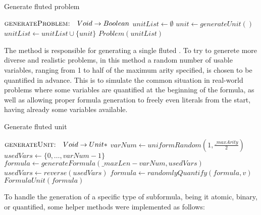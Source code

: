 \begin{algorithm}[H]
  \caption{Generate fluted problem}\label{alg:generate-fluted-problem}
  \begin{algorithmic}[1]
      \Statex{}  \(\textsc{generateProblem:} \quad Void \to Boolean\)
        \State{} \(unitList \gets \emptyset\)
          \State{} \(unit \gets generateUnit()\)
          \State{} \(unitList \gets unitList \cup \{unit\}\)
        \EndFor{}
        \State{} \Return{} \(Problem(unitList)\)
      \EndFunction{}
  \end{algorithmic}
\end{algorithm}



The  method is responsible for generating a single fluted .
To try to generete more diverse and realistic problems, in this method a random number of usable variables, ranging from 1 to half of the maximum arity specified, is chosen to be quantified in advance.
This is to simulate the common situation in real-world problems where some variables are quantified at the beginning of the formula, as well as allowing proper formula generation to freely even literals from the start, having already some variables available.

\begin{algorithm}[H]
  \caption{Generate fluted unit}\label{alg:generate-fluted-unit}
  \begin{algorithmic}[1]
      \Statex{}  \(\textsc{generateUnit:} \quad Void \to Unit*\)
        \State{} \(varNum \gets uniformRandom(1, \frac{\_maxArity}{2})\)
        \State{} \(usedVars \gets \{0,\ldots,varNum-1\}\)
        \State{} \(formula \gets generateFormula(\_maxLen-varNum, usedVars)\)
        \State{} \(usedVars \gets reverse(usedVars)\)
          \State{} \(formula \gets randomlyQuantify(formula, v)\)
        \EndFor{}
        \State{} \Return{} \(FormulaUnit(formula)\)
      \EndFunction{}
  \end{algorithmic}
\end{algorithm}

To handle the generation of a specific type of subformula, being it atomic, binary, or quantified, some helper methods were implemented as follows:

